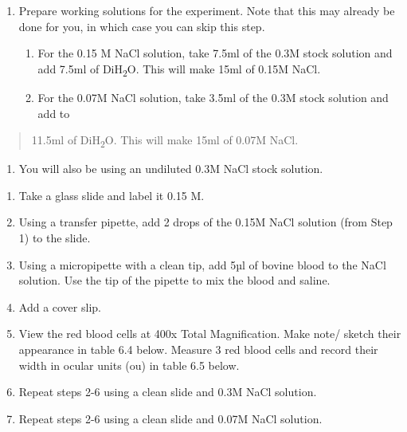 \documentclass[
  letterpaper,
  DIV=11,
  numbers=noendperiod]{scrreprt}
\providecommand{\tightlist}{%
  \setlength{\itemsep}{0pt}\setlength{\parskip}{0pt}}
\begin{document}
\begin{enumerate}
\def\labelenumi{\arabic{enumi}.}
\item
  Prepare working solutions for the experiment. Note that this may
  already be done for you, in which case you can skip this step.

  \begin{enumerate}
  \def\labelenumii{\alph{enumii}.}
  \item
    For the 0.15 M NaCl solution, take 7.5ml of the 0.3M stock solution
    and add 7.5ml of DiH\textsubscript{2}O. This will make 15ml of 0.15M
    NaCl.
  \item
    For the 0.07M NaCl solution, take 3.5ml of the 0.3M stock solution
    and add to
  \end{enumerate}
\end{enumerate}

\begin{quote}
11.5ml of DiH\textsubscript{2}O. This will make 15ml of 0.07M NaCl.
\end{quote}

\begin{enumerate}
\def\labelenumi{\alph{enumi}.}
\setcounter{enumi}{2}
\tightlist
\item
  You will also be using an undiluted 0.3M NaCl stock solution.
\end{enumerate}

\begin{enumerate}
\def\labelenumi{\arabic{enumi}.}
\setcounter{enumi}{1}
\item
  Take a glass slide and label it 0.15 M.
\item
  Using a transfer pipette, add 2 drops of the 0.15M NaCl solution (from
  Step 1) to the slide.
\item
  Using a micropipette with a clean tip, add 5µl of bovine blood to the
  NaCl solution. Use the tip of the pipette to mix the blood and saline.
\item
  Add a cover slip.
\item
  View the red blood cells at 400x Total Magnification. Make note/
  sketch their appearance in table 6.4 below. Measure 3 red blood cells
  and record their width in ocular units (ou) in table 6.5 below.
\item
  Repeat steps 2-6 using a clean slide and 0.3M NaCl solution.
\item
  Repeat steps 2-6 using a clean slide and 0.07M NaCl solution.
\end{enumerate}
\end{document}
